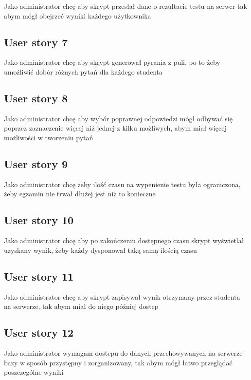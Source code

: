 \documentclass[a4paper]{article}
\begin{document}
Jako administrator chcę aby skrypt przesłał dane o rezultacie testu na serwer tak abym mógł obejrzeć wyniki każdego użytkownika

\subsection{User story 7}

Jako administrator chcę aby skrypt generował pyrania z puli, po to żeby umożliwić dobór różnych pytań dla każdego studenta

\subsection{User story 8}

Jako administrator chcę aby wybór poprawnej odpowiedzi mógł odbywać się poprzez zaznaczenie więcej niż jednej z kilku możliwych, abym miał więcej możliwości w tworzeniu pytań

\subsection{User story 9}

Jako administrator chcę żeby ilość czasu na wypenienie testu była ograniczona, żeby egzamin nie trwał dłużej jest niż to konieczne

\subsection{User story 10}

Jako administrator chcę aby po zakończeniu dostępnego czasu skrypt wyświetlał uzyskany wynik, żeby każdy dysponował taką samą ilością czasu

\subsection{User story 11}

Jako administrator chcę aby skrypt zapisywał wynik otrzymany przez studenta na serwerze, tak abym miał do niego później dostęp

\subsection{User story 12}

Jako administrator wymagam dostepu do danych przechowywanych na serwerze bazy w sposób przystępny i zorganizowany, tak abym mógł łatwo przeglądać poszczególne wyniki
\end{document}
